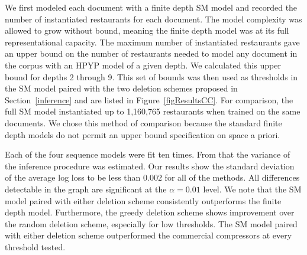 
We first modeled each document with a finite depth SM model and recorded the number of instantiated restaurants for each document.  The model complexity was allowed to grow without bound, meaning the finite depth model was at its full representational capacity.  The maximum number of instantiated restaurants gave an upper bound on the number of restaurants needed to model any document in the corpus with an HPYP model of a given depth.  We calculated this upper bound for depths 2 through 9.  This set of bounds was then used as thresholds in the SM model paired with the two deletion schemes proposed in Section~\ref{inference} and are listed in Figure~\ref{figResultsCC}.  For comparison, the full SM model instantiated up to 1,160,765 restaurants when trained on the same documents.  We chose this method of comparison because the standard finite depth models do not permit an upper bound specification on space a priori.

Each of the four sequence models were fit ten times.  From that the variance of the inference procedure was estimated.  Our results show the standard deviation of the average log loss to be less than $0.002$ for all of the methods.  All differences detectable in the graph are significant at the $\alpha = 0.01$ level. We note that the SM model paired with either deletion scheme consistently outperforms the finite depth model.  Furthermore, the greedy deletion scheme shows improvement over the random deletion scheme, especially for low thresholds.  The SM model paired with either deletion scheme outperformed the commercial compressors at every threshold tested.